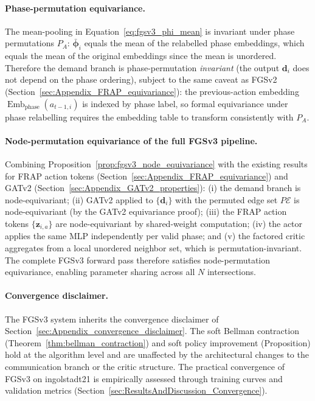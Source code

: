 \paragraph{Phase-permutation equivariance.}
The mean-pooling in Equation~\eqref{eq:fgsv3_phi_mean} is invariant under phase permutations $P_A$: $\bar{\boldsymbol{\phi}}_i$ equals the mean of the relabelled phase embeddings, which equals the mean of the original embeddings since the mean is unordered. Therefore the demand branch is phase-permutation \emph{invariant} (the output $\mathbf{d}_i$ does not depend on the phase ordering), subject to the same caveat as FGSv2 (Section~\ref{sec:Appendix_FRAP_equivariance}): the previous-action embedding $\operatorname{Emb}_{\mathrm{phase}}(a_{t-1,i})$ is indexed by phase label, so formal equivariance under phase relabelling requires the embedding table to transform consistently with $P_A$.

\paragraph{Node-permutation equivariance of the full FGSv3 pipeline.}
Combining Proposition~\ref{prop:fgsv3_node_equivariance} with the existing results for FRAP action tokens (Section~\ref{sec:Appendix_FRAP_equivariance}) and GATv2 (Section~\ref{sec:Appendix_GATv2_properties}): (i) the demand branch is node-equivariant; (ii) GATv2 applied to $\{\mathbf{d}_i\}$ with the permuted edge set $P\mathcal{E}$ is node-equivariant (by the GATv2 equivariance proof); (iii) the FRAP action tokens $\{\mathbf{z}_{i,a}\}$ are node-equivariant by shared-weight computation; (iv) the actor applies the same MLP independently per valid phase; and (v) the factored critic aggregates from a local unordered neighbor set, which is permutation-invariant. The complete FGSv3 forward pass therefore satisfies node-permutation equivariance, enabling parameter sharing across all $N$ intersections.

\paragraph{Convergence disclaimer.}
The FGSv3 system inherits the convergence disclaimer of Section~\ref{sec:Appendix_convergence_disclaimer}. The soft Bellman contraction (Theorem~\ref{thm:bellman_contraction}) and soft policy improvement (Proposition) hold at the algorithm level and are unaffected by the architectural changes to the communication branch or the critic structure. The practical convergence of FGSv3 on ingolstadt21 is empirically assessed through training curves and validation metrics (Section~\ref{sec:ResultsAndDiscussion_Convergence}).


